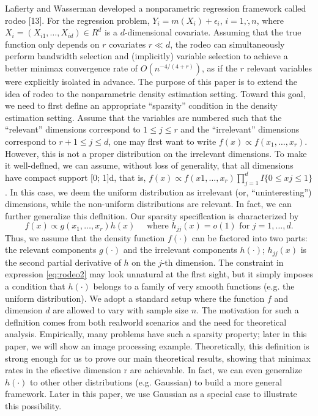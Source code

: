 Lafierty and Wasserman developed a nonparametric regression framework called rodeo [13]. 
For the regression problem, $Y_i = m(X_i)+\epsilon_i$, $i = 1,\dot, n$, where $X_i = (X_{i1},\dots, X_{id}) \in R^d$ is a $d$-dimensional covariate. 
Assuming that the true function only depends on $r$ covariates $r \ll d$, the rodeo can simultaneously perform bandwidth selection and (implicitly) variable selection to achieve a better minimax convergence rate of $O(n^{-4/(4+r)})$, as if the $r$ relevant variables were explicitly isolated in advance. 
The purpose of this paper is to extend the idea of rodeo to the nonparametric density estimation setting. 
Toward this goal, we need to flrst deflne an appropriate ``sparsity'' condition in the density estimation setting. 
Assume that the variables are numbered such that the ``relevant'' dimensions correspond to $1 \le j \le r$ and the ``irrelevant'' dimensions correspond to $r + 1 \le j \le d$, one may flrst want to write $f(x) \propto f(x_1, \dots, x_r)$. 
However, this is not a proper distribution on the irrelevant dimensions. 
To make it well-deflned, we can assume, without loss of generality, that all dimensions have compact support [0; 1]d, that is, $f(x) \propto f(x1, \dots, x_r) \prod^d_{j=1} I\{0 \le xj \le 1\}$. 
In this case, we deem the uniform distribution as irrelevant (or, ``uninteresting'') dimensions, while the non-uniform distributions are relevant. 
In fact, we can further generalize this deflnition. Our sparsity speciflcation is characterized by
\begin{equation}\label{eq:rodeo2}
    f(x) \propto g\left(x_{1}, \ldots, x_{r}\right) h(x) \quad \text { where } h_{j j}(x)=o(1) \text { for } j=1, \ldots, d.
\end{equation}
Thus, we assume that the density function $f(\cdot)$ can be factored into two parts: the relevant components $g(\cdot)$ and the irrelevant components $h(\cdot)$; $h_{jj}(x)$ is the second partial derivative of $h$ on the $j$-th dimension. 
The constraint in expression \ref{eq:rodeo2} may look unnatural at the flrst sight, but it simply imposes a condition that $h(\cdot)$ belongs to a family of very smooth functions (e.g. the uniform distribution). 
We adopt a standard setup where the function $f$ and dimension $d$ are allowed to vary with sample size $n$. 
The motivation for such a deflnition comes from both realworld scenarios and the need for theoretical analysis. 
Empirically, many problems have such a sparsity property; later in this paper, we will show an image processing example. 
Theoretically, this definition is strong enough for us to prove our main theoretical results, showing that minimax rates in the efiective dimension r are achievable. 
In fact, we can even generalize $h(\cdot)$ to other other distributions (e.g. Gaussian) to build a more general framework. 
Later in this paper, we use Gaussian as a special case to illustrate this possibility.

